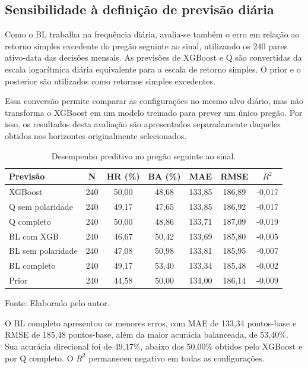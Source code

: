 \subsection{Sensibilidade à definição de previsão diária}

Como o BL trabalha na frequência diária, avalia-se também
o erro em relação ao retorno simples excedente do pregão
seguinte ao sinal, utilizando os 240 pares ativo-data
das decisões mensais. As previsões de XGBoost e Q são
convertidas da escala logarítmica diária equivalente para
a escala de retorno simples. O prior e o posterior são
utilizados como retornos simples excedentes.

Essa conversão permite comparar as configurações no mesmo
alvo diário, mas não transforma o XGBoost em um modelo
treinado para prever um único pregão. Por isso, os resultados
desta avaliação são apresentados separadamente daqueles
obtidos nos horizontes originalmente selecionados.

\begin{table}[H]
\centering
\caption{Desempenho preditivo no pregão seguinte ao sinal.}
\label{tab:desempenho_pregao_seguinte}
{\footnotesize
\renewcommand{\arraystretch}{0.85}
\begin{tabular}{@{}lcccccc@{}}
\hline
Previsão & N & HR (\%) & BA (\%) & MAE & RMSE & $R^2$ \\
\hline
XGBoost & 240 & 50,00 & 48,68 & 133,85 & 186,89 & -0,017 \\
Q sem polaridade & 240 & 49,17 & 47,65 & 133,85 & 186,92 & -0,017 \\
Q completo & 240 & 50,00 & 48,86 & 133,71 & 187,09 & -0,019 \\
BL com XGB & 240 & 46,67 & 50,42 & 133,69 & 185,80 & -0,005 \\
BL sem polaridade & 240 & 47,08 & 50,98 & 133,81 & 185,95 & -0,007 \\
BL completo & 240 & 49,17 & 53,40 & 133,34 & 185,48 & -0,002 \\
Prior & 240 & 44,58 & 50,00 & 134,00 & 186,14 & -0,009 \\
\hline
\end{tabular}}
\par{}
\par
Fonte: Elaborado pelo autor.
\end{table}

O BL completo apresentou os menores erros, com MAE de
133,34 pontos-base e RMSE de 185,48 pontos-base, além da
maior acurácia balanceada, de 53,40\%. Sua acurácia direcional
foi de 49,17\%, abaixo dos 50,00\% obtidos pelo XGBoost
e por Q completo. O $R^2$ permaneceu negativo em todas
as configurações.

